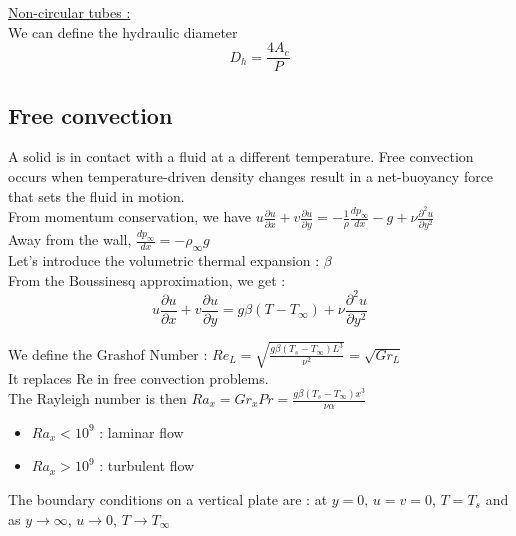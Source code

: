 \documentclass[../main.tex]{subfiles}
\begin{document}
\quad \underline{Non-circular tubes :}\\
We can define the hydraulic diameter \begin{equation}
    D_h = \frac{4A_c}{P}
\end{equation}


\subsection{Free convection}
A solid is in contact with a fluid at a different temperature. Free convection occurs when temperature-driven density changes result in a net-buoyancy force that sets the fluid in motion. \\

From momentum conservation, we have $u \frac{\partial u}{\partial x} + v \frac{\partial u}{\partial y} = -\frac{1}{\rho} \frac{d p_\infty}{dx} - g + \nu \frac{\partial^2 u}{\partial y^2}$\\

Away from the wall, $\frac{dp_\infty}{dx} = -\rho_\infty g$\\
Let's introduce the volumetric thermal expansion : $\beta$\\

From the Boussinesq approximation, we get : \begin{equation}
    u \frac{\partial u}{\partial x} + v \frac{\partial u}{\partial y} = g \beta(T-T_\infty) + \nu \frac{\partial^2 u}{\partial y^2}
\end{equation}

We define the Grashof Number : $Re_L = \sqrt{\frac{g\beta(T_s-T_\infty)L^3}{\nu^2}} = \sqrt{Gr_L}$\\

It replaces Re in free convection problems.\\

The Rayleigh number is then $Ra_x = Gr_x Pr = \frac{g\beta (T_s-T_\infty)x^3}{\nu \alpha}$\\

\begin{itemize}
    \item $Ra_x<10^9$ : laminar flow\\
    \item $Ra_x > 10^9$ : turbulent flow\\
\end{itemize}

The boundary conditions on a vertical plate are : at $y=0$, $u=v=0$, $T=T_s$ and as $y\rightarrow \infty$, $u\rightarrow 0$, $T\rightarrow T_\infty$\\
\end{document}

